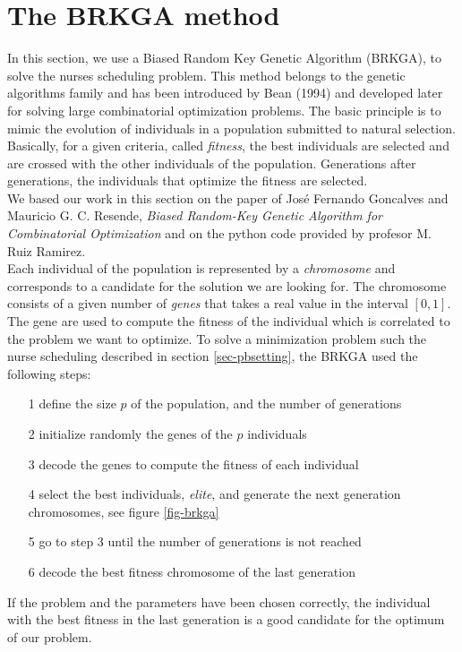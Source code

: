 \documentclass[11pt]{article}
\begin{document}
\section{The BRKGA method}
In this section, we use a Biased Random Key Genetic Algorithm (BRKGA), to solve the nurses scheduling problem. This method belongs to the genetic algorithms family and has been introduced by Bean (1994) and developed later for solving large combinatorial optimization problems. The basic principle is to mimic the evolution of individuals in a population submitted to natural selection. Basically, for a given criteria, called {\it fitness}, the best individuals are selected and are crossed with the other individuals of the population. Generations after generations, the individuals that optimize the fitness are selected.\\
We based our work in this section on the paper of Jos\'e Fernando Goncalves and Mauricio G. C. Resende, {\it  Biased Random-Key Genetic Algorithm for Combinatorial Optimization} and on the python code provided by profesor M. Ruiz Ramirez.\\

Each individual of the population is represented by a {\it chromosome} and corresponds to a candidate for the solution we are looking for.
 The chromosome consists of a given number of {\it genes} that takes a real value in the interval $[0,1]$. The gene are  used to compute the fitness of the individual which is correlated to the problem we want to optimize.
To solve a minimization problem such the nurse scheduling described in section \ref{sec-pbsetting}, the BRKGA used the following steps:
\begin{itemize}
\item[1] define the size $p$ of the population, and the number of generations
\item[2] initialize randomly the genes of the $p$ individuals
\item[3] decode the genes to compute the fitness of each individual
\item[4] select the best individuals, {\it elite}, and generate the next generation chromosomes, see figure \ref{fig-brkga}
\item[5] go to step 3 until the number of generations is not reached
\item[6] decode the best fitness chromosome of the last generation 
\end{itemize}
If the problem and the parameters have been chosen correctly, the individual with the best fitness in the last generation is a good candidate for the optimum of our problem.\\
\end{document}
